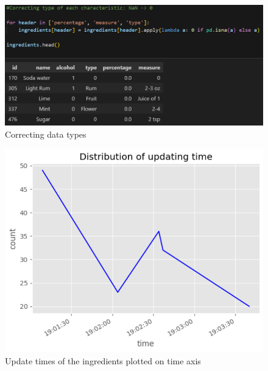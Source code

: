 \documentclass[a4paper]{article}
\begin{document}
\begin{figure}[H]
    \centering
    \includegraphics[width=1\linewidth]{lambdaingr.png}
    \caption{Correcting data types}
    \label{fig:enter-label}
\end{figure}

\begin{figure}[H]
    \centering
    \includegraphics[width=0.75\linewidth]{updatetimes.png}
    \caption{Update times of the ingredients plotted on time axis}
    \label{fig:enter-label}
\end{figure}
\end{document}
